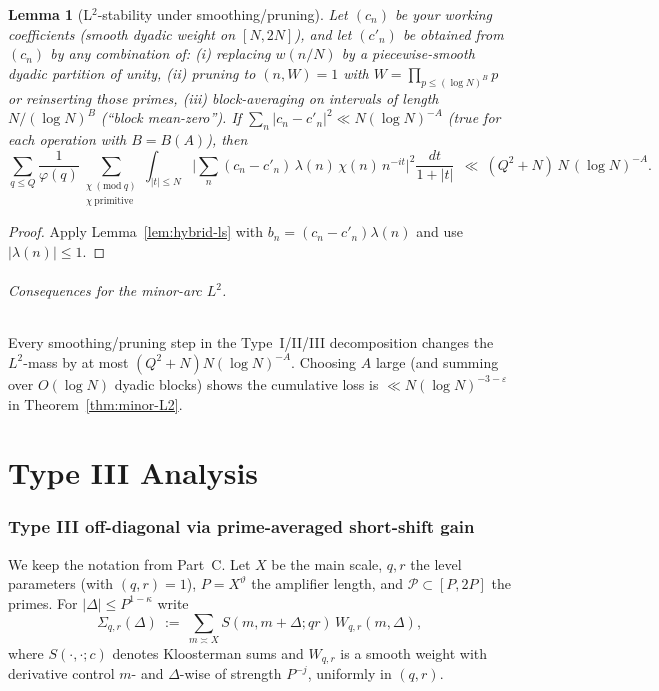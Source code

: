 \documentclass[11pt]{article}
\newtheorem{lemma}{Lemma}[part]
\theoremstyle{definition}
\theoremstyle{remark}
\numberwithin{equation}{part}
\begin{document}
\begin{lemma}[L$^2$-stability under smoothing/pruning]\label{lem:l2-smooth}
	Let $(c_n)$ be your working coefficients (smooth dyadic weight on $[N,2N]$), and let $(c'_n)$ be obtained from $(c_n)$ by any combination of:
	(i) replacing $w(n/N)$ by a piecewise-smooth dyadic partition of unity,
	(ii) pruning to $(n,W)=1$ with $W=\prod_{p\le (\log N)^B}p$ or reinserting those primes,
	(iii) block-averaging on intervals of length $N/(\log N)^B$ (“block mean-zero”).
	If $\sum_n |c_n-c'_n|^2 \ll N(\log N)^{-A}$ (true for each operation with $B=B(A)$), then
	\[
		\sum_{q\le Q} \frac{1}{\varphi(q)}\!\!
		\sum_{\substack{\chi\ (\mathrm{mod}\ q)\\ \chi\ \mathrm{primitive}}}
		\!\int_{|t|\le N}\!
		\Big|\sum_{n} (c_n-c'_n)\,\lambda(n)\,\chi(n)\,n^{-it}\Big|^2\frac{dt}{1+|t|}
		\ \ \ll\ (Q^2+N)\,N\,(\log N)^{-A}.
	\]
\end{lemma}

\begin{proof}
	Apply Lemma~\ref{lem:hybrid-ls} with $b_n=(c_n-c'_n)\lambda(n)$ and use $|\lambda(n)|\le1$.
\end{proof}

\paragraph{Consequences for the minor-arc $L^2$.}
Every smoothing/pruning step in the Type~I/II/III decomposition changes the $L^2$-mass by at most $(Q^2+N)N(\log N)^{-A}$. Choosing $A$ large (and summing over $O(\log N)$ dyadic blocks) shows the cumulative loss is $\ll N(\log N)^{-3-\varepsilon}$ in Theorem~\ref{thm:minor-L2}.


\part{Type III Analysis}

\section{Type III off-diagonal via prime-averaged short-shift gain}\label{sec:typeIII-SSG}

We keep the notation from Part~C. Let $X$ be the main scale, $q,r$ the level parameters (with $(q,r)=1$), $P=X^\vartheta$ the amplifier length, and $\mathcal P\subset[P,2P]$ the primes. For $|\Delta|\le P^{1-\kappa}$ write
\[
	\Sigma_{q,r}(\Delta)\ :=\ \sum_{m\asymp X} S(m,m+\Delta;qr)\,W_{q,r}(m,\Delta),
\]
where $S(\cdot,\cdot;c)$ denotes Kloosterman sums and $W_{q,r}$ is a smooth weight with derivative control $m$- and $\Delta$-wise of strength $P^{-j}$, uniformly in $(q,r)$.
\end{document}
